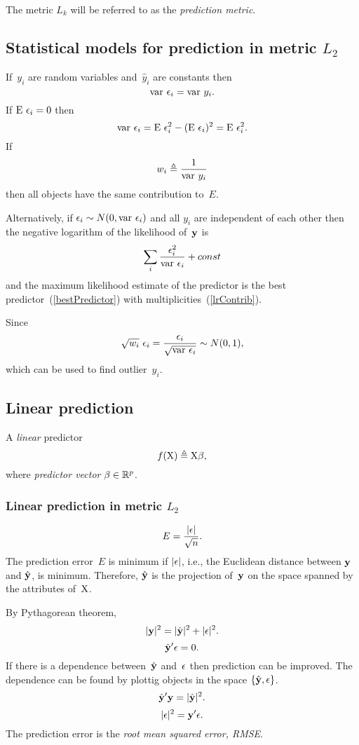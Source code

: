 \documentclass[10pt,a4paper]{article}
\theoremstyle{plain} \newtheorem{Lem}{Lemma}
\begin{document}
The metric $L_k$ will be referred to as the {\em prediction metric}.


\subsection{Statistical models for prediction in metric $L_2$}
If~$y_i$ are random variables and~$\hat y_i$ are constants then
$$ \mathrm {var} \  \epsilon_i = \mathrm {var} \  y_i. $$
If $\mathrm E \  \epsilon_i = 0$ then
$$ \mathrm {var} \  \epsilon_i = \mathrm E \  \epsilon^2_i - (\mathrm E \  \epsilon_i)^2 = \mathrm E \  \epsilon^2_i. $$
If
\begin{equation} \label{lrContrib}
w_i \triangleq \frac 1 {\mathrm {var} \  y_i}
\end{equation}
then all objects have the same contribution to~$E$.

Alternatively,
if $\epsilon_i \sim N(0,\mathrm {var} \  \epsilon_i)$ and all $y_i$ are independent of each other
then the negative logarithm of the likelihood of~$\mathbf y$ is
$$ \sum_i \frac {\epsilon^2_i} {\mathrm {var} \  \epsilon_i} + const $$
and the maximum likelihood estimate of the predictor is the best predictor~(\ref{bestPredictor}) with multiplicities~(\ref{lrContrib}).

Since
$$ \sqrt{w_i} \ \epsilon_i = \frac {\epsilon_i} {\sqrt {\mathrm {var} \  \epsilon_i}}  \sim N(0,1), $$
which can be used to find outlier~$y_i$.




\subsection {Linear prediction} \label{linearPrediction}
A {\em linear} predictor
$$ f(\mathrm X) \triangleq \mathrm X \mathbf \beta, $$
where {\em predictor vector} $\mathbf \beta \in \mathbb R^p$.


\subsubsection {Linear prediction in metric $L_2$} \label{linearPredictionL2}
$$ E = \frac {|\mathbf \epsilon|} {\sqrt{n}}. $$
The prediction error~$E$ is minimum if $|\mathbf \epsilon|$, i.e., the Euclidean distance between $\mathbf y$ and $\hat {\mathbf y}$, is minimum.
Therefore, $\hat {\mathbf y}$ is the projection of~$\mathbf y$ on the space spanned by the attributes of~$\mathrm X$.

By Pythagorean theorem,
$$ |\mathbf y|^2 = |\hat {\mathbf y}|^2 + |\mathbf \epsilon|^2. $$
$$ \hat {\mathbf y}' \mathbf \epsilon = 0. $$
If there is a dependence between~$\hat {\mathbf y}$ and~$\mathbf \epsilon$ then prediction can be improved.
The dependence can be found by plottig objects in the space $\{\hat {\mathbf y}, \mathbf \epsilon\}$.
$$ \hat {\mathbf y}' \mathbf y = |\hat {\mathbf y}|^2. $$
$$ |\mathbf \epsilon|^2 = \mathbf y' \mathbf \epsilon. $$
The prediction error is the {\em root mean squared error, RMSE}.
\end{document}
